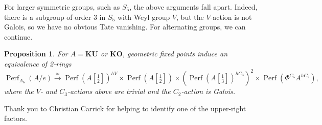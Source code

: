 \documentclass[11pt, a4paper]{article}
\newcommand{\1}{\mathbf{1}}
\newcommand{\gKU}{{\mathbf{KU}}}
\newcommand{\gKO}{{\mathbf{KO}}}
\DeclareMathOperator{\Perf}{Perf}
\theoremstyle{plain}
\newtheorem{prop}[equation]{Proposition}
\theoremstyle{definition}
\theoremstyle{remark}\numberwithin{equation}{section}
\begin{document}

For larger symmetric groups, such as $S_5$, the above arguments fall apart. Indeed, there is a subgroup of order $3$ in $S_5$ with Weyl group $V$, but the $V$-action is not Galois, so we have no obvious Tate vanishing. For alternating groups, we can continue.

\begin{prop}\label{pr:KU_decomp_A6}
    For $A=\gKU$ or $\gKO$, geometric fixed points induce an equivalence of 2-rings
    \[\Perf_{A_6}(A/e) \xrightarrow{\simeq} {\Perf(A[\tfrac{1}{2}])^{hV} \times \Perf(A[\tfrac{1}{2}]) \times \left(\Perf(A[\tfrac{1}{3}])^{hC_3}\right)^2 \times \Perf(\Phi^{C_5} A^{hC_2})},\]
    where the $V$- and $C_3$-actions above are trivial and the $C_2$-action is Galois.
\end{prop}

Thank you to Christian Carrick for helping to identify one of the upper-right factors.
\end{document}
